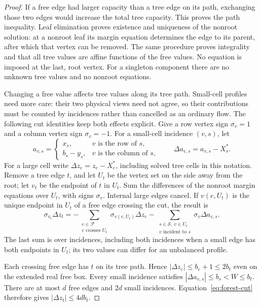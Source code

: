 \begin{proof}
If a free edge had larger capacity than a tree edge on its path,
exchanging those two edges would increase the total tree capacity.
This proves the path inequality.  Leaf elimination proves existence
and uniqueness of the nonroot solution: at a nonroot leaf its margin
equation determines the edge to its parent, after which that vertex
can be removed.  The same procedure proves integrality and that all
tree values are affine functions of the free values.  No equation is
imposed at the last, root vertex.  For a singleton component there
are no unknown tree values and no nonroot equations.

Changing a free value affects tree values along its tree path.
Small-cell profiles need more care: their two physical views need not
agree, so their contributions must be counted by incidences rather than
cancelled as an ordinary flow.  The following cut identities keep both
effects explicit.
Give a row vertex sign $\sigma_v=1$ and a column vertex sign
$\sigma_v=-1$.  For a small-cell incidence $(v,s)$, let
\[
a_{v,s}=\begin{cases}
x_s,&v\text{ is the row of }s,\\
b_s-y_s,&v\text{ is the column of }s,
\end{cases}
\qquad
\Delta a_{v,s}=a_{v,s}-X^*_s.
\]
For a large cell write $\Delta z_e=z_e-X^*_e$, including solved
tree cells in this notation.  Remove a tree edge $t$, and let $U_t$
be the vertex set on the side away from the root; let $v_t$ be the
endpoint of $t$ in $U_t$.  Sum the differences of the nonroot margin
equations over $U_t$, with signs $\sigma_v$.  Internal large edges
cancel.  If $v(e,U_t)$ is the unique endpoint in $U_t$ of a free edge
crossing the cut, the result is
\begin{equation}\label{eq:forest-cut}
\sigma_{v_t}\Delta z_t
=-\sum_{\substack{e\in\mathcal F\\e\text{ crosses }U_t}}
\sigma_{v(e,U_t)}\Delta z_e
-\sum_{\substack{s\in\mathcal S,\ v\in U_t\\v\text{ incident to }s}}
\sigma_v\Delta a_{v,s}.
\end{equation}
The last sum is over incidences, including both incidences when a
small edge has both endpoints in $U_t$; its two values can differ
for an unbalanced profile.

Each crossing free edge has $t$ on its tree path.  Hence
$|\Delta z_e|\le b_e+1\le2b_t$ even on the extended real free box.
Every small incidence satisfies
$|\Delta a_{v,s}|\le b_s<W\le b_t$.  There are at most $d$ free
edges and $2d$ small incidences.  Equation~\eqref{eq:forest-cut}
therefore gives $|\Delta z_t|\le4db_t$.


\end{proof}

